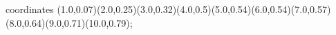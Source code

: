 					coordinates { (1.0,0.07)(2.0,0.25)(3.0,0.32)(4.0,0.5)(5.0,0.54)(6.0,0.54)(7.0,0.57)(8.0,0.64)(9.0,0.71)(10.0,0.79)};